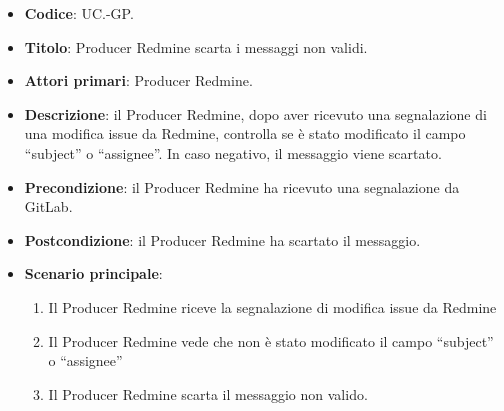 	\begin{itemize}
		\item \textbf{Codice}: UC\theuccount.\thesubuccount-GP.
		\item \textbf{Titolo}: Producer Redmine scarta i messaggi non validi.
		\item \textbf{Attori primari}: Producer Redmine.
		\item \textbf{Descrizione}: il Producer Redmine, dopo aver ricevuto una segnalazione di una modifica issue da Redmine, controlla
		se è stato modificato il campo ``subject'' o ``assignee''. In caso negativo, il messaggio viene scartato.
		\item \textbf{Precondizione}: il Producer Redmine ha ricevuto una segnalazione da GitLab.
		\item \textbf{Postcondizione}: il Producer Redmine ha scartato il messaggio.
		\item \textbf{Scenario principale}: 
		\begin{enumerate}
			\item Il Producer Redmine riceve la segnalazione di modifica issue da Redmine
			\item Il Producer Redmine vede che non è stato modificato il campo ``subject'' o ``assignee''
			\item Il Producer Redmine scarta il messaggio non valido.
		\end{enumerate}
	\end{itemize}